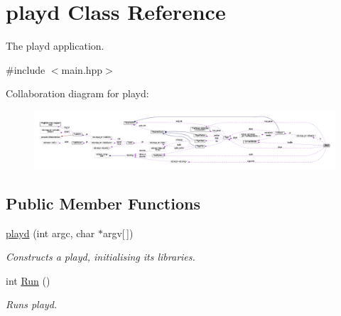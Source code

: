 \hypertarget{classplayd}{\section{playd Class Reference}
\label{classplayd}
}


The playd application.  




{\ttfamily \#include $<$main.\+hpp$>$}



Collaboration diagram for playd\+:
\nopagebreak
\begin{figure}[H]
\begin{center}
\leavevmode
\includegraphics[width=350pt]{classplayd__coll__graph}
\end{center}
\end{figure}
\subsection*{Public Member Functions}
\begin{DoxyCompactItemize}
\item 
\hyperlink{classplayd_a2dfa519ee11ce75fbe389fcf3b15e122}{playd} (int argc, char $\ast$argv\mbox{[}$\,$\mbox{]})
\begin{DoxyCompactList}\small\item\em Constructs a playd, initialising its libraries. \end{DoxyCompactList}\item 
int \hyperlink{classplayd_aee84626965c812db03120ebe3267fcab}{Run} ()
\begin{DoxyCompactList}\small\item\em Runs playd. \end{DoxyCompactList}\end{DoxyCompactItemize}
